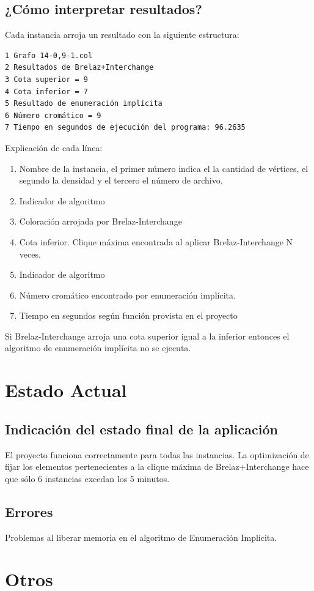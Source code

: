 \documentclass[a4paper,10pt]{article}
\begin{document}
\subsection{¿Cómo interpretar resultados?}
Cada instancia arroja un resultado con la siguiente estructura:
\begin{verbatim}
1 Grafo 14-0,9-1.col
2 Resultados de Brelaz+Interchange
3 Cota superior = 9
4 Cota inferior = 7
5 Resultado de enumeración implícita 
6 Número cromático = 9 
7 Tiempo en segundos de ejecución del programa: 96.2635
\end{verbatim}
Explicación de cada línea:
\begin{enumerate}
 \item Nombre de la instancia, el primer número indica el la cantidad de vértices, el segundo la densidad y el tercero el número de archivo.
\item Indicador de algoritmo
\item Coloración arrojada por Brelaz-Interchange
\item Cota inferior. Clique máxima encontrada al aplicar Brelaz-Interchange N veces.
\item Indicador de algoritmo
\item Número cromático encontrado por enumeración implícita.
\item Tiempo en segundos según función provista en el proyecto
\end{enumerate}
Si Brelaz-Interchange arroja una cota superior igual a la inferior entonces el algoritmo de enumeración implícita 
no se ejecuta.

\section{Estado Actual}
\subsection{Indicación del estado final de la aplicación}
El proyecto funciona correctamente para todas las instancias. La optimización de fijar los elementos pertenecientes a la clique máxima de Brelaz+Interchange hace que sólo 6 instancias excedan los 5 minutos. 
\subsection{Errores}
Problemas al liberar memoria en el algoritmo de Enumeración Implícita.
\newpage
\section{Otros}
\end{document}
